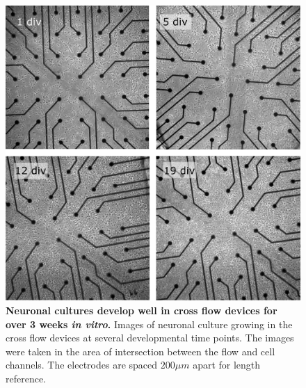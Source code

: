  \begin{figure}[!htb]
       \centering
       \includegraphics[width=15cm]{chapter5/figures/crossFlowDev/culture.jpg}
       \caption[Images of a neuronal culture growing in cross flow devices]{\textbf{Neuronal cultures develop well in cross flow devices for over 3 weeks \textit{in vitro}.} Images of neuronal culture growing in the cross flow devices at several developmental time points. The images were taken in the area of intersection between the flow and cell channels. The electrodes are spaced \(200 \mu m\) apart for length reference.}
       \label{fig:crossFlow:crossFlowDev}
  \end{figure}


